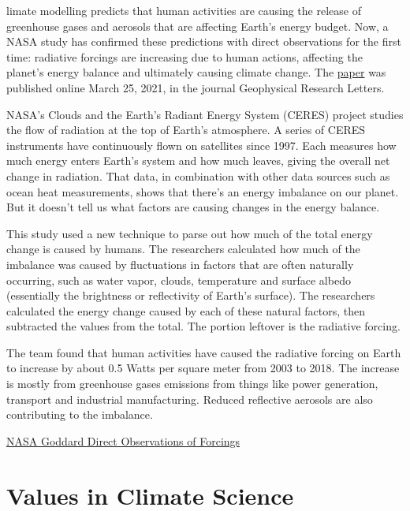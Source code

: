 \documentclass[
]{book}
\begin{document}
limate modelling predicts that human activities are causing the release of greenhouse gases and aerosols that are affecting Earth's energy budget. Now, a NASA study has confirmed these predictions with direct observations for the first time: radiative forcings are increasing due to human actions, affecting the planet's energy balance and ultimately causing climate change.
The \href{https://agupubs.onlinelibrary.wiley.com/doi/10.1029/2020GL091585}{paper} was published online March 25, 2021, in the journal Geophysical Research Letters.

NASA's Clouds and the Earth's Radiant Energy System (CERES) project studies the flow of radiation at the top of Earth's atmosphere. A series of CERES instruments have continuously flown on satellites since 1997. Each measures how much energy enters Earth's system and how much leaves, giving the overall net change in radiation. That data, in combination with other data sources such as ocean heat measurements, shows that there's an energy imbalance on our planet.
But it doesn't tell us what factors are causing changes in the energy balance.

This study used a new technique to parse out how much of the total energy change is caused by humans. The researchers calculated how much of the imbalance was caused by fluctuations in factors that are often naturally occurring, such as water vapor, clouds, temperature and surface albedo (essentially the brightness or reflectivity of Earth's surface).
The researchers calculated the energy change caused by each of these natural factors, then subtracted the values from the total. The portion leftover is the radiative forcing.

The team found that human activities have caused the radiative forcing on Earth to increase by about 0.5 Watts per square meter from 2003 to 2018. The increase is mostly from greenhouse gases emissions from things like power generation, transport and industrial manufacturing. Reduced reflective aerosols are also contributing to the imbalance.

\href{https://www.nasa.gov/feature/goddard/2021/direct-observations-confirm-that-humans-are-throwing-earth-s-energy-budget-off-balance}{NASA Goddard Direct Observations of Forcings}

\hypertarget{values-in-climate-science}{%
\chapter{Values in Climate Science}\label{values-in-climate-science}}
\end{document}
